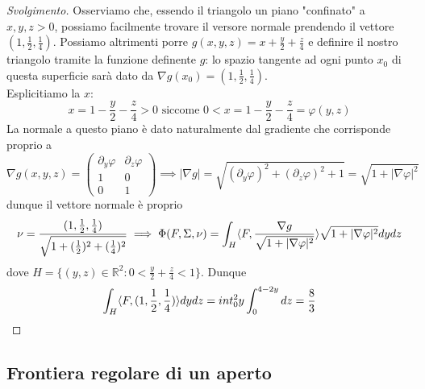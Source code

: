 \begin{proof}[Svolgimento]
	Osserviamo che, essendo il triangolo un piano "confinato" a $x, y, z > 0$, possiamo facilmente trovare il versore normale prendendo il vettore $(1, \frac{1}{2}, \frac{1}{4})$. Possiamo altrimenti porre
	$g(x, y, z) = x + \frac{y}{2} + \frac{z}{4}$ e definire il nostro triangolo tramite la funzione definente $g$: lo spazio tangente ad ogni punto $x_0$ di questa superficie sarà dato da $\nabla g(x_0) = (1, \frac{1}{2},\frac{1}{4})$. \\
	Esplicitiamo la $x$:
	$$
	x = 1 - \frac{y}{2} - \frac{z}{4} > 0 \text{ siccome } 0 < x = 1 - \frac{y}{2} - \frac{z}{4} = \varphi(y, z)
	$$
	La normale a questo piano è dato naturalmente dal gradiente che corrisponde proprio a
	$$
	\nabla g(x, y, z) = \begin{pmatrix} 
		\partial_y \varphi & \partial_z \varphi \\
		1 & 0 \\
		0 & 1
	\end{pmatrix} \implies |\nabla g| = \sqrt{(\partial_y \varphi)^2 + (\partial_z \varphi)^2 + 1} = \sqrt{1 + |\nabla \varphi|^2} 
	$$
	dunque il vettore normale è proprio
	$$
	\nu = \frac{(1, \frac{1}{2}, \frac{1}{4})}{\sqrt{1 + (\frac{1}{2})^2 + (\frac{1}{4})^2}} \implies \Phi(F, \Sigma, \nu) = \int_H \langle F, \frac{\nabla g}{\sqrt{1 + |\nabla \varphi|^2}} \rangle \sqrt{1 + |\nabla \varphi|^2} dydz
	$$
	dove $H = \{(y, z) \in \mathbb{R}^2 : 0 < \frac{y}{2} + \frac{z}{4} < 1 \}$. Dunque
	$$
	\int_H \langle F, (1, \frac{1}{2}, \frac{1}{4}) \rangle dydz =	int_0^2 y \int_0^{4 - 2y} dz = \frac{8}{3}
	$$
\end{proof}

\subsection{Frontiera regolare di un aperto}

